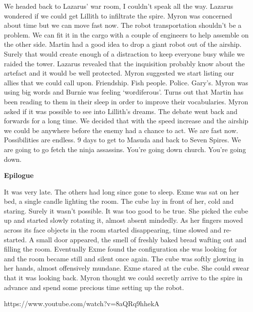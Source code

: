 We headed back to Lazarus’ war room, I couldn’t speak all the way. Lazarus wondered if we could get Lillith to infiltrate the spire. Myron was concerned about time but we can move fast now. The robot transportation shouldn’t be a problem. We can fit it in the cargo with a couple of engineers to help assemble on the other side. Martin had a good idea to drop a giant robot out of the airship. Surely that would create enough of a distraction to keep everyone busy while we raided the tower. Lazarus revealed that the inquisition probably know about the artefact and it would be well protected. Myron suggested we start listing our allies that we could call upon. Friendship. Fish people. Police. Gary’s. Myron was using big words and Burnie was feeling ‘wordiferous’. Turns out that Martin has been reading to them in their sleep in order to improve their vocabularies. Myron asked if it was possible to see into Lillith’s dreams. The debate went back and forwards for a long time. We decided that with the speed increase and the airship we could be anywhere before the enemy had a chance to act. We are fast now. Possibilities are endless. 9 days to get to Masuda and back to Seven Spires. We are going to go fetch the ninja assassins. You’re going down church. You’re going down.\medskip

\textbf{Epilogue}\medskip

It was very late. The others had long since gone to sleep. Exme was sat on her bed, a single candle lighting the room. The cube lay in front of her, cold and staring. Surely it wasn’t possible. It was too good to be true. She picked the cube up and started slowly rotating it, almost absent mindedly. As her fingers moved across its face objects in the room started disappearing, time slowed and re-started. A small door appeared, the smell of freshly baked bread wafting out and filling the room. Eventually Exme found the configuration she was looking for and the room became still and silent once again. The cube was softly glowing in her hands, almost offensively mundane. Exme stared at the cube. She could swear that it was looking back. Myron thought we could secretly arrive to the spire in advance and spend some precious time setting up the robot.\medskip

https://www.youtube.com/watch?v=8aQRq9hhekA

%

\clearpage
